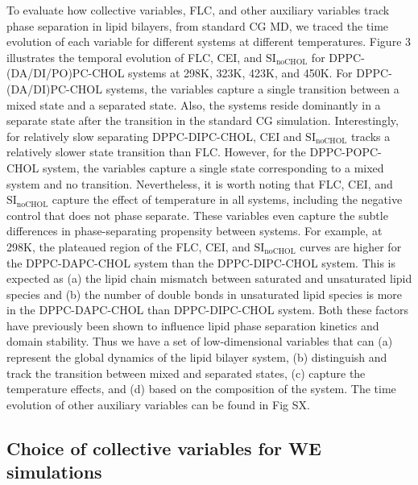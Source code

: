 \documentclass{biophys-new}
\begin{document}
To evaluate how collective variables, FLC, and other auxiliary variables track phase separation in lipid bilayers,
from standard CG MD, we traced the time evolution of each variable for different systems at different temperatures.
Figure 3 illustrates the temporal evolution of FLC, CEI, and $\text{SI}_{\text{noCHOL}}$ for DPPC-(DA/DI/PO)PC-CHOL systems at 298K, 323K, 423K, and 450K.
For DPPC-(DA/DI)PC-CHOL systems, the variables capture a single transition between a mixed state and a separated state.
Also, the systems reside dominantly in a separate state after the transition in the standard CG simulation.
Interestingly, for relatively slow separating DPPC-DIPC-CHOL, CEI and $\text{SI}_{\text{noCHOL}}$ tracks a relatively slower state transition than FLC.
However, for the DPPC-POPC-CHOL system, the variables capture a single state corresponding to a mixed system and no transition.
Nevertheless, it is worth noting that FLC, CEI, and $\text{SI}_{\text{noCHOL}}$ capture the effect of temperature in all systems, including the negative control that does not phase separate.
These variables even capture the subtle differences in phase-separating propensity between systems.
For example, at 298K, the plateaued region of the FLC, CEI, and $\text{SI}_{\text{noCHOL}}$ curves are higher for the DPPC-DAPC-CHOL system than the DPPC-DIPC-CHOL system.
This is expected as (a) the lipid chain mismatch between saturated and unsaturated lipid species and (b) the number of double bonds in unsaturated lipid species is more in the DPPC-DAPC-CHOL than DPPC-DIPC-CHOL system.
Both these factors have previously been shown to influence lipid phase separation kinetics and domain stability\cite {Fowler2016, Lin2016}.
Thus we have a set of low-dimensional variables that can (a) represent the global dynamics of the lipid bilayer system,
(b) distinguish and track the transition between mixed and separated states, (c) capture the temperature effects,
and (d) based on the composition of the system.
The time evolution of other auxiliary variables can be found in Fig SX.
\\

\subsection*{Choice of collective variables for WE simulations}
\end{document}
